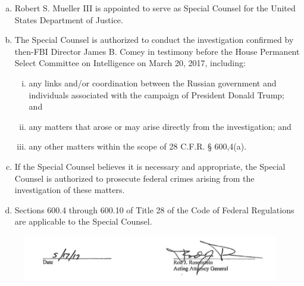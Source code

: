 \begin{enumerate}[(a)]
    \item Robert S. Mueller III is appointed to serve as Special Counsel for the United States Department of Justice.

    \item The Special Counsel is authorized to conduct the investigation confirmed by then-FBI Director James B. Comey in testimony before the House Permanent Select Committee on Intelligence on March 20, 2017, including:

    \begin{enumerate}[(i)]
        \item any links and/or coordination between the Russian government and individuals associated with the campaign of President Donald Trump; and

        \item any matters that arose or may arise directly from the investigation; and

        \item any other matters within the scope of 28 C.F.R. § 600,4(a).
    \end{enumerate}

    \item If the Special Counsel believes it is necessary and appropriate, the Special Counsel is authorized to prosecute federal crimes arising from the investigation of these matters.

    \item Sections 600.4 through 600.10 of Title 28 of the Code of Federal Regulations are applicable to the Special Counsel.
\end{enumerate}

\begin{figure}[hb]
    \vspace{-20pt}
    \begin{center}
        \includegraphics[width=6in]{images/appendix-a-signature.png}%
    \end{center}
    \vspace{-20pt}
\end{figure}

